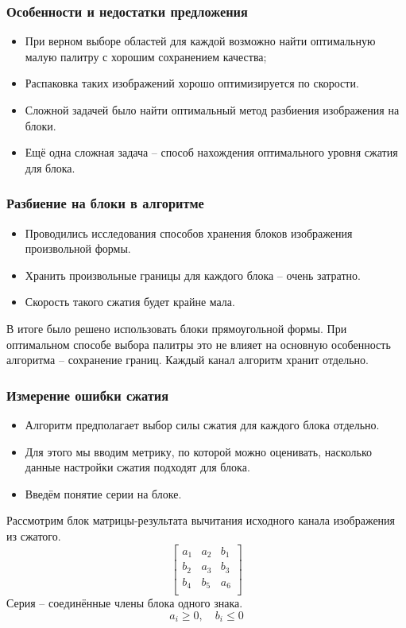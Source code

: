 \documentclass{beamer}
\begin{document}
\begin{frame}
\frametitle{Особенности и недостатки предложения}

\begin{itemize}
  \item При верном выборе областей для каждой возможно найти оптимальную
    малую палитру с хорошим сохранением качества;
  \item Распаковка таких изображений хорошо оптимизируется по скорости.
  \item Сложной задачей было найти оптимальный метод разбиения изображения на блоки.
  \item Ещё одна сложная задача -- способ нахождения оптимального уровня сжатия
    для блока.
\end{itemize}

\end{frame}

\begin{frame}
\frametitle{Разбиение на блоки в алгоритме}

\begin{itemize}
\item Проводились исследования способов хранения блоков изображения произвольной формы.
\item Хранить произвольные границы для каждого блока -- очень затратно.
\item Скорость такого сжатия будет крайне мала.
\end{itemize}

В итоге было решено использовать блоки прямоугольной формы. При оптимальном
способе выбора палитры это не влияет на основную особенность алгоритма --
сохранение границ. Каждый канал алгоритм хранит отдельно.

\end{frame}

\begin{frame}
\frametitle{Измерение ошибки сжатия}

\begin{itemize}
\item Алгоритм предполагает выбор силы сжатия для каждого блока отдельно.
\item Для этого мы вводим метрику, по которой можно оценивать, насколько данные
  настройки сжатия подходят для блока.
\item Введём понятие серии на блоке.
\end{itemize}

Рассмотрим блок матрицы-результата вычитания исходного канала изображения из
сжатого.
\[ \begin{bmatrix}
  a_1 & a_2 & b_1 \\
  b_2 & a_3 & b_3 \\
  b_4 & b_5 & a_6 \\
\end{bmatrix} \]
Серия -- соединённые члены блока одного знака.
\[ a_i \ge 0,\quad b_i \le 0 \]

\end{frame}
\end{document}

